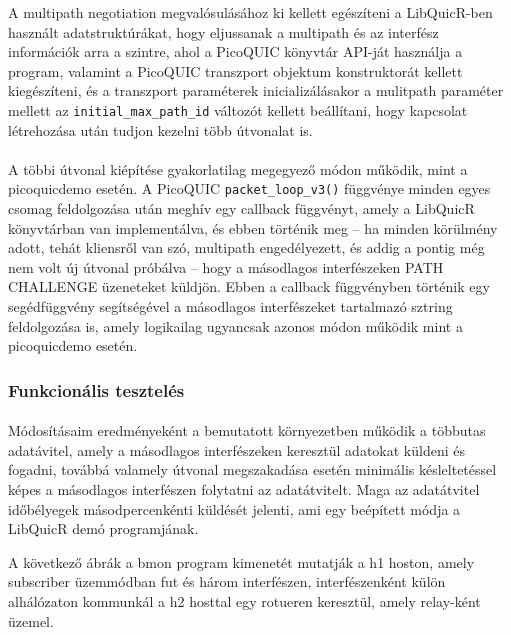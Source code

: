 \documentclass[a4paper,oneside]{article}
\begin{document}
A multipath negotiation megvalósulásához ki kellett egészíteni a LibQuicR-ben
használt adatstruktúrákat, hogy eljussanak a multipath és az interfész információk
arra a szintre, ahol a PicoQUIC könyvtár API-ját használja a program, valamint 
a PicoQUIC transzport objektum konstruktorát 
kellett kiegészíteni, és a transzport paraméterek inicializálásakor a mulitpath paraméter mellett az 
  \texttt{initial\_max\_path\_id}
változót kellett beállítani, hogy kapcsolat létrehozása után tudjon kezelni több útvonalat is.

\paragraph{}

A többi útvonal kiépítése gyakorlatilag megegyező módon működik, mint a picoquicdemo esetén. A PicoQUIC 
  \texttt{packet\_loop\_v3()}
függvénye minden egyes csomag feldolgozása után meghív egy callback függvényt, amely a LibQuicR könyvtárban van 
implementálva, és ebben történik meg – ha minden körülmény adott, tehát kliensről van szó, 
multipath engedélyezett, és addig a pontig még nem volt új útvonal próbálva – hogy a másodlagos interfészeken PATH CHALLENGE üzeneteket küldjön.
Ebben a callback függvényben történik egy segédfüggvény segítségével a másodlagos interfészeket tartalmazó sztring feldolgozása is, amely logikailag
ugyancsak azonos módon működik mint a picoquicdemo esetén.


\subsubsection{Funkcionális tesztelés}
\paragraph{}

Módosításaim eredményeként a bemutatott környezetben működik a többutas adatávitel, 
amely a másodlagos interfészeken keresztül adatokat küldeni és fogadni, továbbá valamely útvonal megszakadása esetén
minimális késleltetéssel képes a másodlagos interfészen folytatni az adatátvitelt.
Maga az adatátvitel időbélyegek másodpercenkénti küldését jelenti, ami egy beépített módja a LibQuicR demó programjának.

A következő ábrák a bmon program kimenetét mutatják a h1 hoston, amely subscriber üzemmódban fut és három interfészen, interfészenként
külön alhálózaton kommunkál a h2 hosttal egy rotueren keresztül, amely relay-ként üzemel.
\end{document}
